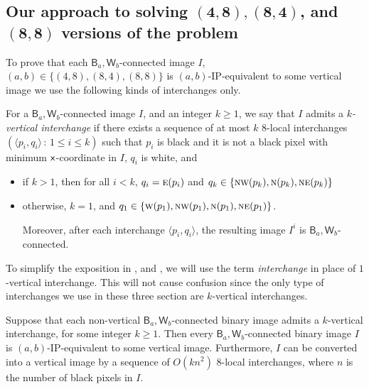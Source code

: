 \documentclass[lotsofwhite,charterfonts]{patmorin}
\newcommand{\N}{\textsc{n}}
\newcommand{\NE}{\textsc{ne}}
\newcommand{\E}{\textsc{e}}
\newcommand{\W}{\textsc{w}}
\newcommand{\NW}{\textsc{nw}}
\newcommand{\x}{\ensuremath{\protect\textup{\textsf{x}}}}
\newcommand{\ic}[2]{\langle #1,#2 \rangle}
\begin{document}
\subsection{Our approach to solving $\mathbf{(4,8), (8,4)}$, and
$\mathbf{(8,8)}$ versions of the problem}

To prove that each $\textsf{B}_a,\textsf{W}_b$-connected image $I$,
$(a,b)\in \{(4,8), (8,4), (8,8)\}$ is $(a,b)$-IP-equivalent to some
vertical image we use the following kinds of interchanges only.

For a $\textsf{B}_a,\textsf{W}_b$-connected image $I$, and an integer
$k\geq 1$, we say that $I$ admits a \emph{$k$-vertical interchange} if
there exists a sequence of at most $k$ $8$-local interchanges
$(\ic{p_i}{q_i}\, :\, 1\leq i\leq k)$ such that $p_i$ is black and it
is not a black pixel  with minimum \x-coordinate in $I$, $q_i$ is
white, and 

\begin{itemize} 

\item if $k>1$, then for all $i<k$, $q_i=\E(p_i)$ and
$q_k\in\{\NW(p_k),\N(p_k),\NE(p_k)\}$ 

\item otherwise, $k=1$, and
$q_1\in\{\W(p_1),\NW(p_1),\N(p_1),\NE(p_1)\}$.

Moreover, after each interchange $\ic{p_i}{q_i}$, the resulting
image $I^i$ is $\textsf{B}_a,\textsf{W}_b$-connected. 
\end{itemize}

To simplify the exposition in , 
and , we will use the term \emph{interchange} in
place of $1$-vertical interchange. This will not cause confusion since
the only type of interchanges we use in these three section are
$k$-vertical interchanges.

\begin{lem} 
Suppose that each non-vertical $\textsf{B}_a,\textsf{W}_b$-connected
binary image admits a $k$-vertical interchange, for some integer
$k\geq 1$. Then every $\textsf{B}_a,\textsf{W}_b$-connected binary
image $I$ is $(a,b)$-IP-equivalent to some vertical image.
Furthermore, $I$ can be converted into a vertical image by a sequence
of $O(kn^2)$ 8-local interchanges, where $n$ is the number of black
pixels in $I$.
\end{lem}
\end{document}
